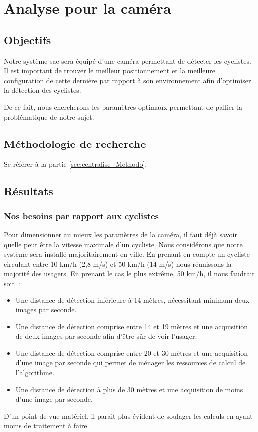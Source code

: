 
\section{Analyse pour la caméra}
\label{sec:camera}

\subsection{Objectifs}
\label{sec:camera_Objectifs}

Notre système \gls{sae} sera équipé d'une caméra permettant de détecter les cyclistes.
Il est important de trouver le meilleur positionnement et la meilleure configuration
de cette dernière par rapport à son environnement afin d'optimiser la détection des cyclistes.

De ce fait, nous chercherons les paramètres optimaux permettant de pallier la problématique de notre sujet.

\subsection{Méthodologie de recherche}
\label{sec:camera_Methodo}

Se référer à la partie \ref{sec:centralise_Methodo}.

\subsection{Résultats}
\label{sec:camera_resultats}

\subsubsection{Nos besoins par rapport aux cyclistes}
\label{sec:camera_cycliste}

Pour dimensionner au mieux les paramètres de la caméra, il faut déjà savoir quelle peut être la vitesse maximale d’un cycliste.
Nous considérons que notre système sera installé majoritairement en ville.
En prenant en compte un cycliste circulant entre 10 km/h (2,8 m/s) et 50 km/h (14 m/s) nous réunissons la majorité des usagers.
En prenant le cas le plus extrême, 50 km/h, il nous faudrait soit :
\begin{itemize}
    \item Une distance de détection inférieure à 14 mètres, nécessitant minimum deux images par seconde.
    \item Une distance de détection comprise entre 14 et 19 mètres et une acquisition de deux images par seconde afin
          d’être sûr de voir l’usager.
    \item Une distance de détection comprise entre 20 et 30 mètres et une acquisition d'une image par seconde qui permet
          de ménager les ressources de calcul de l’algorithme.
    \item Une distance de détection à plus de 30 mètres et une acquisition de moins d'une image par seconde.
\end{itemize}
D'un point de vue matériel, il parait plus évident de soulager les calculs en ayant moins de traitement à faire.

